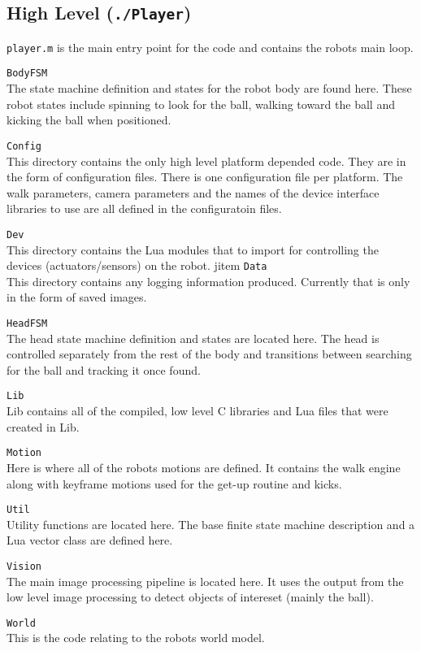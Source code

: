 \documentclass{article}
\begin{document}
  \subsection{High Level (\texttt{./Player})}
  
    \texttt{player.m} is the main entry point for the code and contains the robots main loop.
    
    \begin{description}
      \item \texttt{BodyFSM} \\
        The state machine definition and states for the robot body are found here. These robot states include spinning to look for the ball, walking toward the ball and kicking the ball when positioned.  
      \item \texttt{Config} \\
        This directory contains the only high level platform depended code. They are in the form of configuration files. There is one configuration file per platform. The walk parameters, camera parameters and the names of the device interface libraries to use are all defined in the configuratoin files. 
      \item \texttt{Dev} \\
        This directory contains the Lua modules that to import for controlling the devices (actuators/sensors) on the robot.
      jitem \texttt{Data} \\
        This directory contains any logging information produced. Currently that is only in the form of saved images.
      \item \texttt{HeadFSM} \\
        The head state machine definition and states are located here. The head is controlled separately from the rest of the body and transitions between searching for the ball and tracking it once found.
      \item \texttt{Lib} \\
        Lib contains all of the compiled, low level C libraries and Lua files that were created in Lib.
      \item \texttt{Motion} \\
        Here is where all of the robots motions are defined. It contains the walk engine along with keyframe motions used for the get-up routine and kicks.
      \item \texttt{Util} \\
        Utility functions are located here. The base finite state machine description and a Lua vector class are defined here.
      \item \texttt{Vision} \\
        The main image processing pipeline is located here. It uses the output from the low level image processing to detect objects of intereset (mainly the ball).
      \item \texttt{World} \\
        This is the code relating to the robots world model.
    \end{description}
\end{document}
